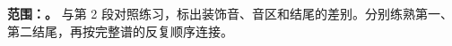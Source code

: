 \textbf{范围：\CurrentSegmentRange。} 与第 2 段对照练习，标出装饰音、音区和结尾的差别。分别练熟第一、第二结尾，再按完整谱的反复顺序连接。
\SegmentScore
